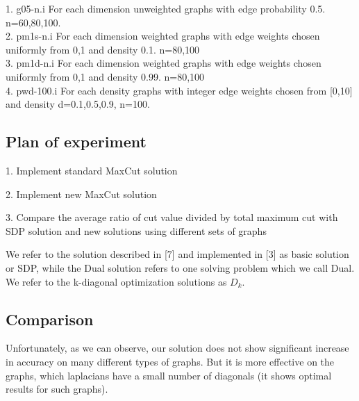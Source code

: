 \documentclass{article}
\begin{document}
1. g05-n.i For each dimension unweighted graphs with edge probability 0.5. n=60,80,100.
\\
2. pm1s-n.i For each dimension weighted graphs with edge weights chosen uniformly from {0,1} and density 0.1. n=80,100
\\
3. pm1d-n.i For each dimension weighted graphs with edge weights chosen uniformly from {0,1} and density 0.99. n=80,100
\\
4. pwd-100.i For each density graphs with integer edge weights chosen from [0,10] and density d=0.1,0.5,0.9, n=100.


\subsection{Plan of experiment}
1. Implement standard MaxCut solution

2. Implement new MaxCut solution

3. Compare the average ratio of cut value divided by total maximum cut with SDP solution and new solutions  using different sets of graphs

We refer to the solution described in [7] and implemented in [3] as basic solution or SDP, while the Dual solution refers to one solving problem which we call Dual. We refer to the k-diagonal optimization solutions as $D_k$.
\




\subsection{Comparison}
 Unfortunately, as we can observe, our solution does not show significant increase in accuracy on many different types of graphs. But it is more effective on the graphs, which laplacians have a small number of diagonals (it shows optimal results for such graphs).
\end{document}
